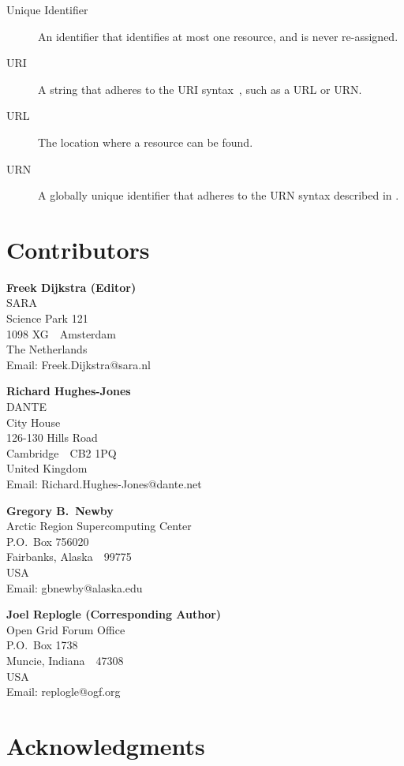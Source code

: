 \documentclass[12pt]{article}  %
\begin{document}
\begin{description}
  \item[Unique Identifier] An identifier that identifies at most one resource, 
    and is never re-assigned.

  \item[URI] A string that adheres to the URI syntax~\cite{rfc3986}, such as a URL or URN.

  \item[URL] The location where a resource can be found.

  \item[URN] A globally unique identifier that adheres to the URN syntax described 
    in \cite{rfc2141}.
\end{description}

\section{Contributors}

\textbf{Freek Dijkstra (Editor)} \\
SARA \\
Science Park 121 \\
1098 XG\ \  Amsterdam \\
The Netherlands \\
Email: Freek.Dijkstra@sara.nl

\textbf{Richard Hughes-Jones} \\
DANTE \\
City House \\
126-130 Hills Road \\
Cambridge\ \ CB2 1PQ \\
United Kingdom \\
Email: Richard.Hughes-Jones@dante.net

\textbf{Gregory B.\ Newby} \\
Arctic Region Supercomputing Center \\
P.O.\ Box 756020 \\
Fairbanks, Alaska\ \ 99775 \\
USA \\
Email: gbnewby@alaska.edu

\textbf{Joel Replogle (Corresponding Author)} \\
Open Grid Forum Office \\
P.O.\ Box 1738 \\
Muncie, Indiana\ \ 47308 \\
USA \\
Email: replogle@ogf.org

\section{Acknowledgments}
\end{document}
